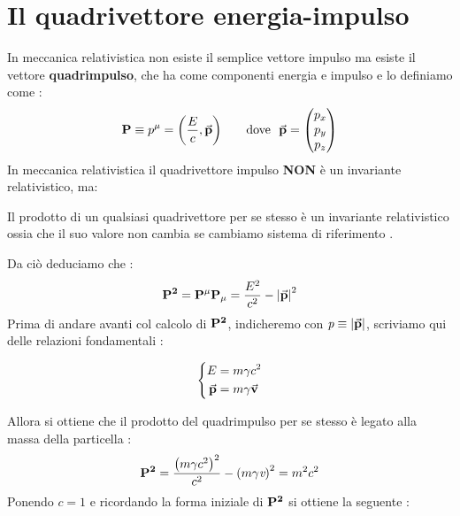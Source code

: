 \chapter{Il quadrivettore energia-impulso}
In meccanica relativistica non esiste il semplice vettore impulso ma esiste il vettore \textbf{quadrimpulso}, che ha come componenti energia e impulso 
e lo definiamo come : 
\begin{align*}
        \vb{P} \equiv p^{\mu} = \qty(\frac{E}{c}, \va{p}) \tag*{dove \ $ \va{p} = \begin{pmatrix} p_{x} \\ p_{y} \\ p_{z} \end{pmatrix}$} 
\end{align*}
In meccanica relativistica il quadrivettore impulso \textbf{NON} è un invariante relativistico, ma: 
\\
\begin{tcolorbox}[colback=red!5!white,colframe=red!50!black,title=ATTENZIONE !]
Il prodotto di un qualsiasi quadrivettore per se stesso è un invariante relativistico ossia che il suo valore non cambia se cambiamo sistema di riferimento . 
\end{tcolorbox}
Da ciò deduciamo che :
\begin{align*}
        \vb{P^{2}} = \vb{P^{\mu}}\vb{P_{\mu}} = \frac{E^{2}}{c^2} - \abs{\va{p}}^2
\end{align*}
Prima di andare avanti col calcolo di $\vb{P^{2}}$, indicheremo con $\textit{p} \equiv \abs{\va{p}}$, scriviamo qui delle relazioni fondamentali : \\
\begin{tcolorbox}[colback=red!5!white,colframe=red!50!black,title=ATTENZIONE !]
\begin{equation*}
        \left\{ \begin{aligned}
                        E &= m\gamma c^{2} \\
                        \va{p} &= m\gamma\va{v} 
                \end{aligned}
                \right.
\end{equation*}
\end{tcolorbox}
Allora si ottiene che il prodotto del quadrimpulso per se stesso è legato alla massa della particella : 
\begin{align*}
        \vb{P^2} = \frac{\qty(m\gamma c^{2})^2}{c^2} - \qty(m\gamma\textit{v})^2 = m^2c^2
\end{align*}
\newpage
Ponendo $c = 1$ e ricordando la forma iniziale di $\vb{P^2}$ si ottiene la seguente : \\

